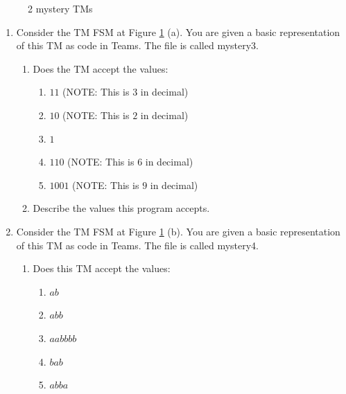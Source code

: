 \begin{appendices}
\begin{figure}[htb]
\begin{subfigure}{0.8\textwidth}
        \caption{}
    \end{subfigure}
    \caption{2 mystery TMs}
    \label{fig:TM_questions}
\end{figure}
\begin{enumerate}
    \item Consider the TM FSM at Figure \ref{fig:TM_questions} (a). You are given a basic representation of this TM as code in Teams. The file is called mystery3.
    \begin{enumerate}
        \item Does the TM accept the values:
        \begin{enumerate}
            \item $11$ (NOTE: This is $3$ in decimal)
            \item $10$ (NOTE: This is $2$ in decimal)
            \item $1$
            \item $110$ (NOTE: This is $6$ in decimal)
            \item $1001$ (NOTE: This is $9$ in decimal)
        \end{enumerate}
        
        \item Describe the values this program accepts.
    \end{enumerate} 
    
    \item Consider the TM FSM at Figure \ref{fig:TM_questions} (b). You are given a basic representation of this TM as code in Teams. The file is called mystery4.
    \begin{enumerate}
        \item Does this TM accept the values:
        \begin{enumerate}
            \item $ab$
            \item $abb$
            \item $aabbbb$            
            \item $bab$
            \item $abba$
        \end{enumerate}


\end{enumerate}
\end{enumerate}
\end{appendices}
